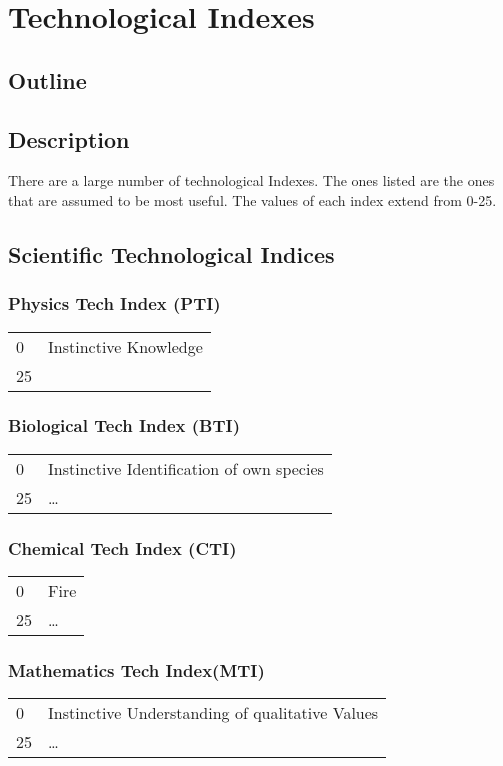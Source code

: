 \chapter{Technological Indexes}
\section{Outline}

\section{Description}
There are a large number of technological Indexes. The ones listed 
are the ones that are assumed to be most useful. The values of each 
index extend from 0-25.
\section{Scientific Technological Indices}

\subsection{Physics Tech Index    (PTI)}
\begin{tabular}{ll}
	0	& Instinctive Knowledge \\
	25	&                       \\
\end{tabular}

\subsection{Biological Tech Index (BTI)}
\begin{tabular}[t]{ll}
	0	& Instinctive Identification of own species \\
	25	& \dots \\
\end{tabular}

\subsection{Chemical Tech Index   (CTI)}
\begin{tabular}[b]{ll}
	0	& Fire \\
	25	& \dots \\
\end{tabular}

\subsection{Mathematics Tech Index(MTI)}
\begin{tabular}{ll}
	0	& Instinctive Understanding of qualitative Values \\
	25	& \dots \\
\end{tabular}

